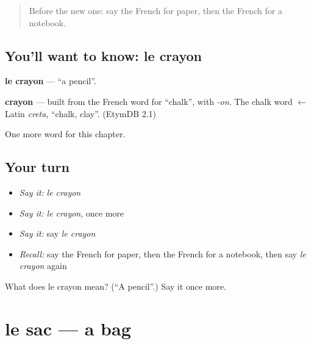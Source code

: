 \label{lesson:FR-C78-crayon}



\begin{quote}
Before the new one: say the French for paper, then the French for a notebook.
\end{quote}

\subsection*{You'll want to know: le crayon}
\textbf{le crayon} — \textquotedblleft{}a pencil\textquotedblright{}.

\begin{cousinweb}
\textbf{crayon} — built from the French word for \textquotedblleft{}chalk\textquotedblright{}, with \emph{-on}. The chalk word $\leftarrow$ Latin \emph{creta}, \textquotedblleft{}chalk, clay\textquotedblright{}. (EtymDB 2.1)
\end{cousinweb}

\begin{grammarlens}[title={What you've built}]
One more word for this chapter.
\end{grammarlens}

\subsection*{Your turn}
\begin{itemize}
\raggedright
  \item \emph{Say it:} \emph{le crayon}
  \item \emph{Say it:} \emph{le crayon}, once more
  \item \emph{Say it:} say \emph{le crayon}
  \item \emph{Recall:} say the French for paper, then the French for a notebook, then say \emph{le crayon} again
\end{itemize}

\begin{tcolorbox}[breakable,colback=teal!4,colframe=teal!35!black,title={Before you move on}]
What does le crayon mean? (\textquotedblleft{}A pencil\textquotedblright{}.) Say it once more.
\end{tcolorbox}
\section[le sac]{le sac — a bag}

\label{lesson:FR-C78-sac}



